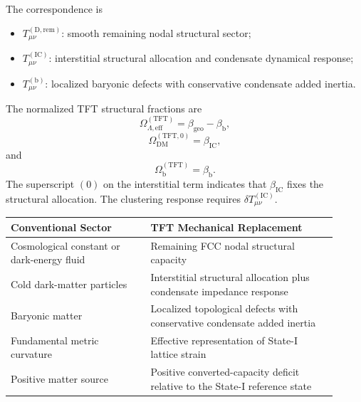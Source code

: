 The correspondence is
\begin{itemize}
    \item $T_{\mu\nu}^{(\mathrm{D},\mathrm{rem})}$: smooth remaining nodal structural sector;
    \item $T_{\mu\nu}^{(\mathrm{IC})}$: interstitial structural allocation and condensate dynamical response;
    \item $T_{\mu\nu}^{(\mathrm{b})}$: localized baryonic defects with conservative condensate added inertia.
\end{itemize}

The normalized TFT structural fractions are
\begin{equation}
    \Omega_{\Lambda,\mathrm{eff}}^{(\mathrm{TFT})} = \beta_{\mathrm{geo}}-\beta_{\mathrm{b}},
\end{equation}
\begin{equation}
    \Omega_{\mathrm{DM}}^{(\mathrm{TFT},0)} = \beta_{\mathrm{IC}},
\end{equation}
and
\begin{equation}
    \Omega_{\mathrm{b}}^{(\mathrm{TFT})} = \beta_{\mathrm{b}}.
\end{equation}
The superscript $(0)$ on the interstitial term indicates that $\beta_{\mathrm{IC}}$ fixes the structural allocation. The clustering response requires $\delta T_{\mu\nu}^{(\mathrm{IC})}$.

\begin{table}[H]
    \centering
    \renewcommand{\arraystretch}{1.4}
    \begin{tabular}{p{0.39\linewidth} p{0.52\linewidth}}
        \toprule
        \textbf{Conventional Sector} & \textbf{TFT Mechanical Replacement} \\
        \midrule
        Cosmological constant or dark-energy fluid & Remaining FCC nodal structural capacity \\
        Cold dark-matter particles & Interstitial structural allocation plus condensate impedance response \\
        Baryonic matter & Localized topological defects with conservative condensate added inertia \\
        Fundamental metric curvature & Effective representation of State-I lattice strain \\
        Positive matter source & Positive converted-capacity deficit relative to the State-I reference state \\
        \bottomrule
    \end{tabular}
\end{table}

